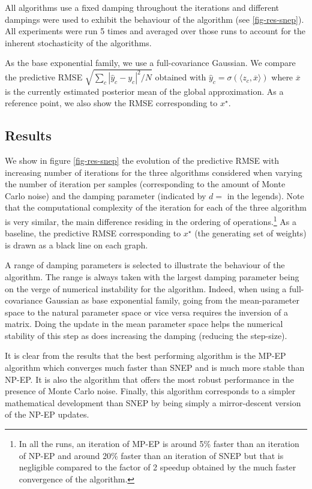 All algorithms use a fixed damping throughout the iterations and different dampings were used to exhibit the behaviour of the algorithm (see \ref{fig-res-snep}). All experiments were run 5 times and averaged over those runs to account for the inherent stochasticity of the algorithms. 

As the base exponential family, we use a full-covariance Gaussian. We compare the predictive RMSE $\sqrt{\sum_c |\hat y_c-y_c|^2/N}$ obtained with $\hat y_c = \sigma(\langle z_c, \overline x\rangle)$ where $\overline x$ is the currently estimated posterior mean of the global approximation. As a reference point, we also show the RMSE corresponding to $x^\star$.

\subsection{Results}

We show in figure \ref{fig-res-snep} the evolution of the predictive RMSE with increasing number of iterations for the three algorithms considered when varying the number of iteration per samples (corresponding to the amount of Monte Carlo noise) and the damping parameter (indicated by $d=$ in the legends). Note that the computational complexity of the iteration for each of the three algorithm is very similar, the main difference residing in the ordering of operations.\footnote{In all the runs, an iteration of MP-EP is around 5\% faster than an iteration of NP-EP and around 20\% faster than an iteration of SNEP but that is negligible compared to the factor of 2 speedup obtained by the much faster convergence of the algorithm.} As a baseline, the predictive RMSE corresponding to $x^{\star}$ (the generating set of weights) is drawn as a black line on each graph.

A range of damping parameters is selected to illustrate the behaviour of the algorithm. The range is always taken with the largest damping parameter being on the verge of numerical instability for the algorithm. Indeed, when using a full-covariance Gaussian as base exponential family, going from the mean-parameter space to the natural parameter space or vice versa requires the inversion of a matrix. Doing the update in the mean parameter space helps the numerical stability of this step as does increasing the damping (reducing the step-size).

It is clear from the results that the best performing algorithm is the MP-EP algorithm which converges much faster than SNEP and is much more stable than NP-EP. It is also the algorithm that offers the most robust performance in the presence of Monte Carlo noise. Finally, this algorithm corresponds to a simpler mathematical development than SNEP by being simply a mirror-descent version of the NP-EP updates. 

